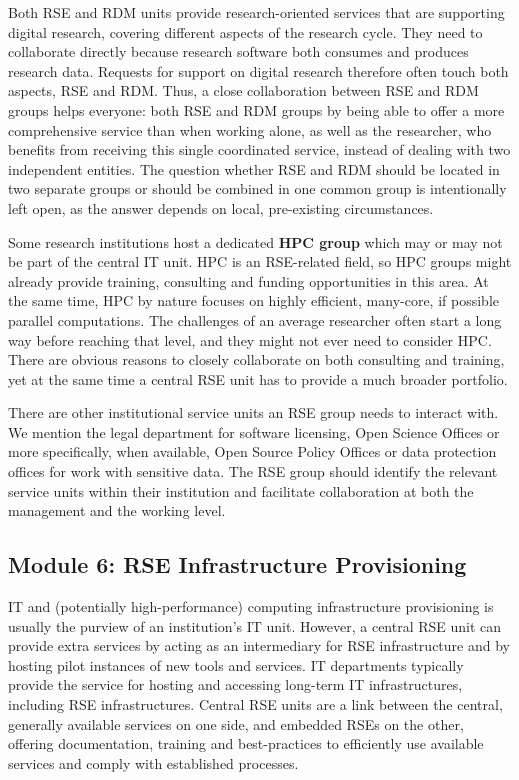 \documentclass[a4paper]{article}
\begin{document}
Both RSE and RDM units provide research-oriented services that are supporting digital research, covering different aspects of the research cycle.
They need to collaborate directly because research software both consumes and produces research data.
Requests for support on digital research therefore often touch both aspects, RSE and RDM\@.
Thus, a close collaboration between RSE and RDM groups helps everyone: both RSE and RDM groups by being able to offer a more comprehensive service than when working alone, as well as the researcher, who benefits from receiving this single coordinated service, instead of dealing with two independent entities.
The question whether RSE and RDM should be located in two separate groups or should be combined in one common group is intentionally left open, as the answer depends on local, pre-existing circumstances.

Some research institutions host a dedicated \textbf{HPC group} which may or may not be part of the central IT unit.
HPC is an RSE-related field, so HPC groups might already provide training, consulting and funding opportunities in this area.
At the same time, HPC by nature focuses on highly efficient, many-core, if possible parallel computations.
The challenges of an average researcher often start a long way before reaching that level, and they might not ever need to consider HPC\@.
There are obvious reasons to closely collaborate on both consulting and training, yet at the same time a central RSE unit has to provide a much broader portfolio.

There are other institutional service units an RSE group needs to interact with.
We mention the legal department for software licensing, Open Science Offices or more specifically, when available, Open Source Policy Offices or data protection offices for work with sensitive data.
The RSE group should identify the relevant service units within their institution and facilitate collaboration at both the management and the working level.

\subsection{Module 6: RSE Infrastructure Provisioning}%
\label{sec:infrastructure}

IT and (potentially high-performance) computing infrastructure provisioning is usually the purview of an institution's IT unit.
However, a central RSE unit can provide extra services by acting as an intermediary for RSE infrastructure and by hosting pilot instances of new tools and services.
IT departments typically provide the service for hosting and accessing long-term IT infrastructures, including RSE infrastructures.
Central RSE units are a link between the central, generally available services on one side,
  and embedded RSEs on the other, offering documentation, training and best-practices to efficiently use available services and comply with established processes.
\end{document}
